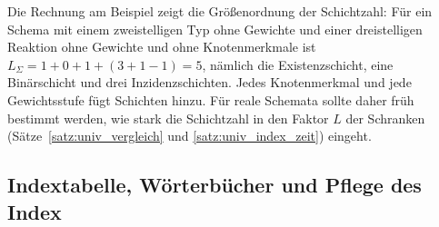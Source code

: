 \documentclass[a4paper,12pt, twoside]{report}
\theoremstyle{definition}
\begin{document}
Die Rechnung am Beispiel zeigt die Größenordnung der Schichtzahl: Für ein Schema mit einem zweistelligen Typ ohne Gewichte und einer dreistelligen Reaktion ohne Gewichte und ohne Knotenmerkmale ist $L_\Sigma=1+0+1+(3+1-1)=5$, nämlich die Existenzschicht, eine Binärschicht und drei Inzidenzschichten. Jedes Knotenmerkmal und jede Gewichtsstufe fügt Schichten hinzu. Für reale Schemata sollte daher früh bestimmt werden, wie stark die Schichtzahl in den Faktor $L$ der Schranken (Sätze~\ref{satz:univ_vergleich} und \ref{satz:univ_index_zeit}) eingeht.

\subsection{Indextabelle, Wörterbücher und Pflege des Index}
\label{sec:ausb_univ_index}
\end{document}
